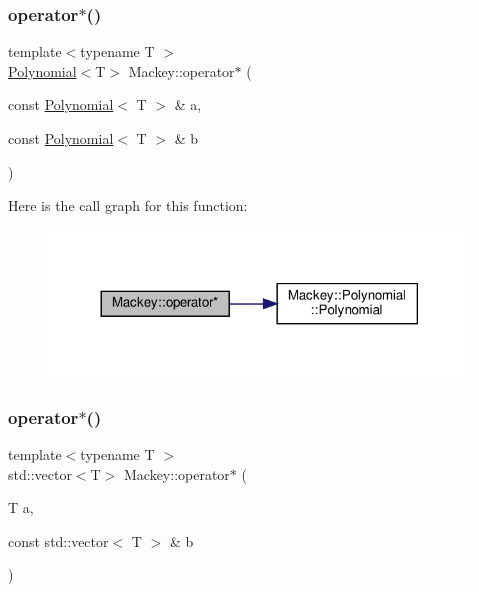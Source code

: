 \subsubsection{\texorpdfstring{operator$\ast$()}{operator*()}\hspace{0.1cm}{\footnotesize\ttfamily [1/2]}}
{\footnotesize\ttfamily template$<$typename T $>$ \\
\hyperlink{classMackey_1_1Polynomial}{Polynomial}$<$T$>$ Mackey\+::operator$\ast$ (\begin{DoxyParamCaption}\item[{const \hyperlink{classMackey_1_1Polynomial}{Polynomial}$<$ T $>$ \&}]{a,  }\item[{const \hyperlink{classMackey_1_1Polynomial}{Polynomial}$<$ T $>$ \&}]{b }\end{DoxyParamCaption})}

Here is the call graph for this function\+:\nopagebreak
\begin{figure}[H]
\begin{center}
\leavevmode
\includegraphics[width=317pt]{namespaceMackey_a7bbd83e8170a608aea65f7d916b4bc6d_cgraph}
\end{center}
\end{figure}
\mbox{\label{namespaceMackey_ae235ee5dd92dc1ca64388b8fbb1b4d75}} 
\subsubsection{\texorpdfstring{operator$\ast$()}{operator*()}\hspace{0.1cm}{\footnotesize\ttfamily [2/2]}}
{\footnotesize\ttfamily template$<$typename T $>$ \\
std\+::vector$<$T$>$ Mackey\+::operator$\ast$ (\begin{DoxyParamCaption}\item[{T}]{a,  }\item[{const std\+::vector$<$ T $>$ \&}]{b }\end{DoxyParamCaption})}




